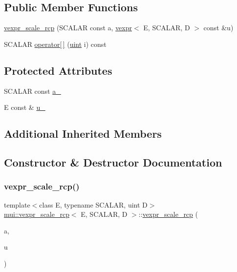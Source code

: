 \subsection*{Public Member Functions}
\begin{DoxyCompactItemize}
\item 
\hyperlink{structmui_1_1vexpr__scale__rcp_a7897bcfe600ca1d10d72e473f69a1503}{vexpr\+\_\+scale\+\_\+rcp} (S\+C\+A\+L\+AR const a, \hyperlink{structmui_1_1vexpr}{vexpr}$<$ E, S\+C\+A\+L\+AR, D $>$ const \&u)
\item 
S\+C\+A\+L\+AR \hyperlink{structmui_1_1vexpr__scale__rcp_a515eb7fc3d3509ae79c9edc2eb1d4455}{operator\mbox{[}$\,$\mbox{]}} (\hyperlink{namespacemui_af15a3e7188a2117fb9965277bb0cacd2}{uint} i) const
\end{DoxyCompactItemize}
\subsection*{Protected Attributes}
\begin{DoxyCompactItemize}
\item 
S\+C\+A\+L\+AR const \hyperlink{structmui_1_1vexpr__scale__rcp_a9011d5a588003afb678c4ca1f531564b}{a\+\_\+}
\item 
E const  \& \hyperlink{structmui_1_1vexpr__scale__rcp_a72d43edaa3c545d5e06e561512b533ec}{u\+\_\+}
\end{DoxyCompactItemize}
\subsection*{Additional Inherited Members}


\subsection{Constructor \& Destructor Documentation}
\mbox{\label{structmui_1_1vexpr__scale__rcp_a7897bcfe600ca1d10d72e473f69a1503}} 
\subsubsection{\texorpdfstring{vexpr\+\_\+scale\+\_\+rcp()}{vexpr\_scale\_rcp()}}
{\footnotesize\ttfamily template$<$class E, typename S\+C\+A\+L\+AR, uint D$>$ \\
\hyperlink{structmui_1_1vexpr__scale__rcp}{mui\+::vexpr\+\_\+scale\+\_\+rcp}$<$ E, S\+C\+A\+L\+AR, D $>$\+::\hyperlink{structmui_1_1vexpr__scale__rcp}{vexpr\+\_\+scale\+\_\+rcp} (\begin{DoxyParamCaption}\item[{S\+C\+A\+L\+AR const}]{a,  }\item[{\hyperlink{structmui_1_1vexpr}{vexpr}$<$ E, S\+C\+A\+L\+AR, D $>$ const \&}]{u }\end{DoxyParamCaption})\hspace{0.3cm}{\ttfamily [inline]}}



